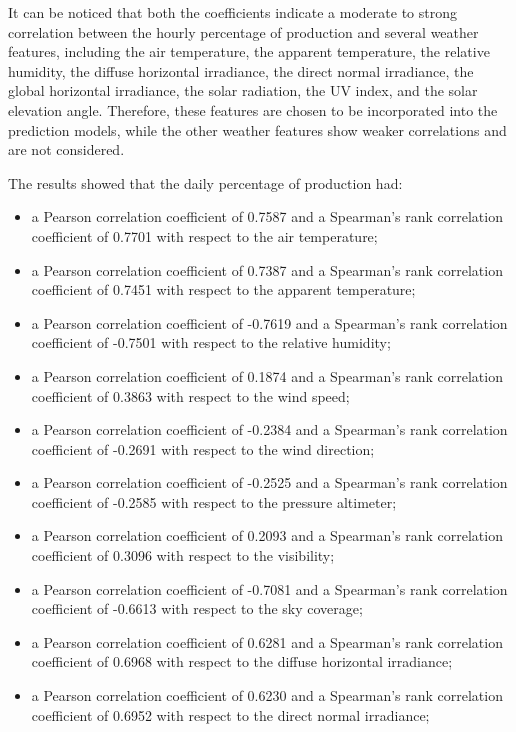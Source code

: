 It can be noticed that both the coefficients indicate a moderate to strong correlation between the hourly percentage of production and several weather features, including the air temperature, the apparent temperature, the relative humidity, the diffuse horizontal irradiance, the direct normal irradiance, the global horizontal irradiance, the solar radiation, the UV index, and the solar elevation angle.
Therefore, these features are chosen to be incorporated into the prediction models, while the other weather features show weaker correlations and are not considered.

The results showed that the daily percentage of production had:
\begin{itemize}
  \item a Pearson correlation coefficient of 0.7587 and a Spearman's rank correlation coefficient of 0.7701 with respect to the air temperature;
  \item a Pearson correlation coefficient of 0.7387 and a Spearman's rank correlation coefficient of 0.7451 with respect to the apparent temperature;
  \item a Pearson correlation coefficient of -0.7619 and a Spearman's rank correlation coefficient of -0.7501 with respect to the relative humidity;
  \item a Pearson correlation coefficient of 0.1874 and a Spearman's rank correlation coefficient of 0.3863 with respect to the wind speed;
  \item a Pearson correlation coefficient of -0.2384 and a Spearman's rank correlation coefficient of -0.2691 with respect to the wind direction;
  \item a Pearson correlation coefficient of -0.2525 and a Spearman's rank correlation coefficient of -0.2585 with respect to the pressure altimeter;
  \item a Pearson correlation coefficient of 0.2093 and a Spearman's rank correlation coefficient of 0.3096 with respect to the visibility;
  \item a Pearson correlation coefficient of -0.7081 and a Spearman's rank correlation coefficient of -0.6613 with respect to the sky coverage;
  \item a Pearson correlation coefficient of 0.6281 and a Spearman's rank correlation coefficient of 0.6968 with respect to the diffuse horizontal irradiance;
  \item a Pearson correlation coefficient of 0.6230 and a Spearman's rank correlation coefficient of 0.6952 with respect to the direct normal irradiance;

\end{itemize}
